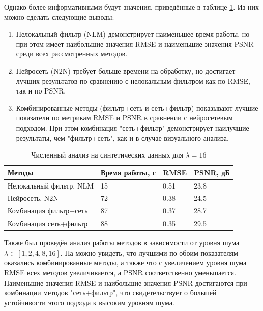 \par Однако более информативными будут значения, приведённые в таблице \ref{tab:synthetic-denoise-16}. Из них можно сделать следующие выводы:
\begin{enumerate}
	\item Нелокальный фильтр (NLM) демонстрирует наименьшее время работы, но при этом имеет наибольшие значения RMSE и наименьшие значения PSNR среди всех рассмотренных методов.
	\item Нейросеть (N2N) требует больше времени на обработку, но достигает лучших результатов по сравнению с нелокальным фильтром как по RMSE, так и по PSNR.
	\item Комбинированные методы (фильтр+сеть и сеть+фильтр) показывают лучшие показатели по метрикам RMSE и PSNR в сравнении с нейросетевым подходом. При этом комбинация "сеть+фильтр" демонстрирует наилучшие результаты, чем "фильтр+сеть", как и в случае визуального анализа.
\end{enumerate}  
\begin{table} [H]%
	\centering\small
	\caption{Численный анализ на синтетических данных для $\lambda=16$}%
	\label{tab:synthetic-denoise-16}
	\begin{tabular}{|l|l|l|l|}
		\hline
		Методы&Время работы, с&RMSE&PSNR, дБ\\
		\hline
		Нелокальный фильтр, NLM
		&15&0.51&23.8\\ \hline
		Нейросеть, N2N&72&0.38&24.5\\ \hline
		Комбинация фильтр+сеть
		&87&0.37&28.7\\ \hline Комбинация сеть+фильтр
		&88&0.35&29.5\\ \hline		
	\end{tabular}
	\normalsize%
\end{table}
\par Также был проведён анализ работы методов в зависимости от уровня шума $\lambda \in [1, 2, 4, 8, 16]$. На  можно увидеть, что лучшими по обоим показателям оказались комбинированные методы, а также что с увеличением уровня шума RMSE всех методов увеличивается, а PSNR соответственно уменьшается. Наименьшие значения RMSE и наибольшие значения PSNR достигаются при комбинации методов "сеть+фильтр", что свидетельствует о большей устойчивости этого подхода к высоким уровням шума.
